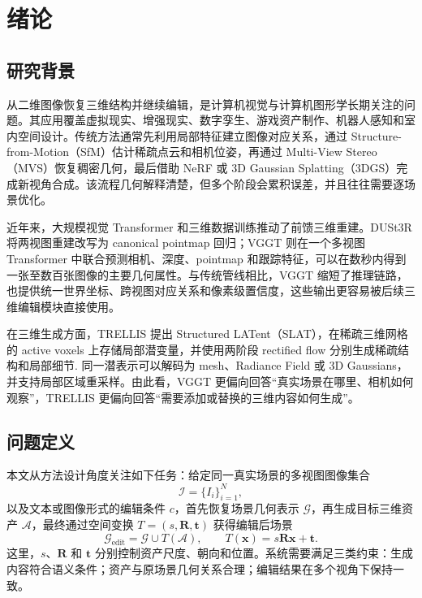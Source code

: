 \section{绪论}

\subsection{研究背景}

从二维图像恢复三维结构并继续编辑，是计算机视觉与计算机图形学长期关注的问题。其应用覆盖虚拟现实、增强现实、数字孪生、游戏资产制作、机器人感知和室内空间设计。传统方法通常先利用局部特征建立图像对应关系，通过 Structure-from-Motion（SfM）估计稀疏点云和相机位姿，再通过 Multi-View Stereo（MVS）恢复稠密几何，最后借助 NeRF 或 3D Gaussian Splatting（3DGS）完成新视角合成。该流程几何解释清楚，但多个阶段会累积误差，并且往往需要逐场景优化。

近年来，大规模视觉 Transformer 和三维数据训练推动了前馈三维重建。DUSt3R 将两视图重建改写为 canonical pointmap 回归\cite{dust3r}；VGGT 则在一个多视图 Transformer 中联合预测相机、深度、pointmap 和跟踪特征\cite{vggt}，可以在数秒内得到一张至数百张图像的主要几何属性。与传统管线相比，VGGT 缩短了推理链路，也提供统一世界坐标、跨视图对应关系和像素级置信度，这些输出更容易被后续三维编辑模块直接使用。

在三维生成方面，TRELLIS 提出 Structured LATent（SLAT），在稀疏三维网格的 active voxels 上存储局部潜变量，并使用两阶段 rectified flow 分别生成稀疏结构和局部细节\cite{trellis}. 同一潜表示可以解码为 mesh、Radiance Field 或 3D Gaussians，并支持局部区域重采样。由此看，VGGT 更偏向回答“真实场景在哪里、相机如何观察”，TRELLIS 更偏向回答“需要添加或替换的三维内容如何生成”。

\subsection{问题定义}

本文从方法设计角度关注如下任务：给定同一真实场景的多视图图像集合
\begin{equation}
  \mathcal{I}=\{I_i\}_{i=1}^{N},
\end{equation}
以及文本或图像形式的编辑条件 $c$，首先恢复场景几何表示 $\mathcal{G}$，再生成目标三维资产 $\mathcal{A}$，最终通过空间变换 $T=(s,\mathbf{R},\mathbf{t})$ 获得编辑后场景
\begin{equation}
  \mathcal{G}_{\mathrm{edit}}
  =\mathcal{G}\cup T(\mathcal{A}),\qquad
  T(\mathbf{x})=s\mathbf{R}\mathbf{x}+\mathbf{t}.
\end{equation}
这里，$s$、$\mathbf{R}$ 和 $\mathbf{t}$ 分别控制资产尺度、朝向和位置。系统需要满足三类约束：生成内容符合语义条件；资产与原场景几何关系合理；编辑结果在多个视角下保持一致。

